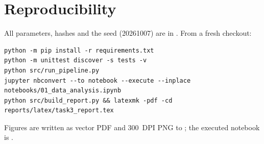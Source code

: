 \documentclass[11pt,a4paper]{article}
\begin{document}
\section{Reproducibility}
All parameters, hashes and the seed (20261007) are in . From a fresh checkout:
{\footnotesize
\begin{verbatim}
python -m pip install -r requirements.txt
python -m unittest discover -s tests -v
python src/run_pipeline.py
jupyter nbconvert --to notebook --execute --inplace notebooks/01_data_analysis.ipynb
python src/build_report.py && latexmk -pdf -cd reports/latex/task3_report.tex
\end{verbatim}
}
Figures are written as vector PDF and 300~DPI PNG to ; the executed notebook is .
\end{document}

